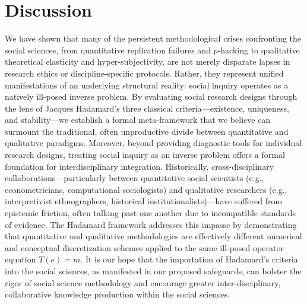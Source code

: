 \documentclass{article}
\theoremstyle{definition}
\begin{document}
\section{Discussion}

We have shown that many of the persistent methodological crises confronting the social sciences, from quantitative replication failures and $p$-hacking to qualitative theoretical elasticity and hyper-subjectivity, are not merely disparate lapses in research ethics or discipline-specific protocols. Rather, they represent unified manifestations of an underlying structural reality: social inquiry operates as a natively ill-posed inverse problem. By evaluating social research designs through the lens of Jacques Hadamard’s three classical criteria—existence, uniqueness, and stability—we establish a formal meta-framework that we believe can surmount the traditional, often unproductive divide between quantitative and qualitative paradigms. Moreover, beyond providing diagnostic tools for individual research designs, treating social inquiry as an inverse problem offers a formal foundation for interdisciplinary integration. Historically, cross-disciplinary collaborations—particularly between quantitative social scientists (e.g., econometricians, computational sociologists) and qualitative researchers (e.g., interpretivist ethnographers, historical institutionalists)—have suffered from epistemic friction, often talking past one another due to incompatible standards of evidence. The Hadamard framework addresses this impasse by demonstrating that quantitative and qualitative methodologies are effectively different numerical and conceptual discretization schemes applied to the same ill-posed operator equation $T(e) = m$. It is our hope that the importation of Hadamard's criteria into the social sciences, as manifested in our proposed safeguards, can bolster the rigor of social science methodology and encourage greater inter-disciplinary, collaborative knowledge production within the social sciences. 

\printbibliography
\end{document}
